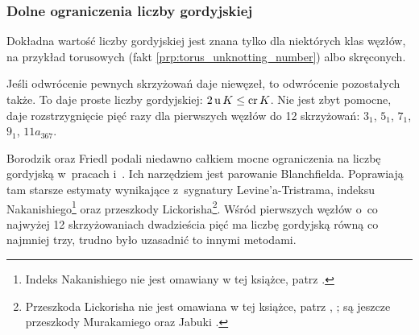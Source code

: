 
\subsubsection{Dolne ograniczenia liczby gordyjskiej}
Dokładna wartość liczby gordyjskiej jest znana tylko dla niektórych klas węzłów, na przykład torusowych (fakt \ref{prp:torus_unknotting_number}) albo skręconych.
%
%

Jeśli odwrócenie pewnych skrzyżowań daje niewęzeł, to odwrócenie pozostałych także.
To daje proste liczby gordyjskiej: $2 \operatorname{u} K \le \operatorname{cr} K$.
Nie jest zbyt pomocne, daje rozstrzygnięcie pięć razy dla pierwszych węzłów do 12 skrzyżowań: $3_{1}$, $5_{1}$, $7_{1}$, $9_{1}$, $11a_{367}$.

Borodzik oraz Friedl podali niedawno całkiem mocne ograniczenia na liczbę gordyjską w~pracach \cite{borodzik14} i~\cite{borodzik15}.
%
%
Ich narzędziem jest parowanie Blanchfielda.
%
Poprawiają tam starsze estymaty wynikające z~sygnatury Levine'a-Tristrama, indeksu Nakanishiego\footnote{Indeks Nakanishiego nie jest omawiany w tej książce, patrz \cite{nakanishi81}.} oraz przeszkody Lickorisha\footnote{Przeszkoda Lickorisha nie jest omawiana w tej książce, patrz \cite{cochran86}, \cite{lickorish85}; są jeszcze przeszkody Murakamiego \cite{murakami90} oraz Jabuki \cite{jabuka10}.}.
%
%
%
Wśród pierwszych węzłów o~co najwyżej 12 skrzyżowaniach dwadzieścia pięć ma liczbę gordyjską równą co najmniej trzy, trudno było uzasadnić to innymi metodami.

